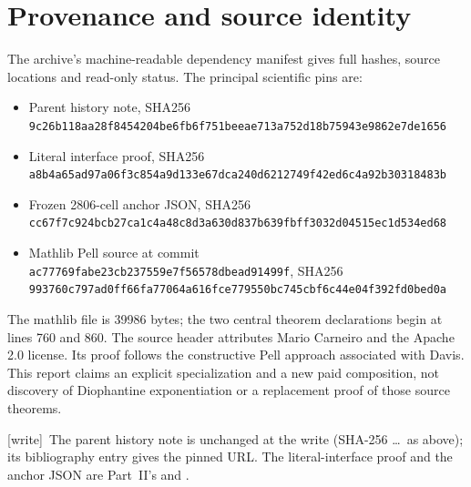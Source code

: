 \documentclass[11pt,letterpaper]{article}
\theoremstyle{definition}\newtheorem{definition}[theorem]{Definition}
\theoremstyle{remark}\newtheorem{remark}[theorem]{Remark}
\newcommand{\codeu}[1]{\nolinkurl{#1}}
\newcommand{\wtag}{\textup{[write]}}
\begin{document}
\section{Provenance and source identity}\label{ptr:ai:app:provenance}
The archive's machine-readable dependency manifest gives full hashes, source locations and read-only status. The principal scientific pins are:
\begin{itemize}
\item Parent history note, SHA256 \codeu{9c26b118aa28f8454204be6fb6f751beeae713a752d18b75943e9862e7de1656}
\item Literal interface proof, SHA256 \codeu{a8b4a65ad97a06f3c854a9d133e67dca240d6212749f42ed6c4a92b30318483b}
\item Frozen 2806-cell anchor JSON, SHA256 \codeu{cc67f7c924bcb27ca1c4a48c8d3a630d837b639fbff3032d04515ec1d534ed68}
\item Mathlib Pell source at commit \codeu{ac77769fabe23cb237559e7f56578dbead91499f}, SHA256 \codeu{993760c797ad0ff66fa77064a616fce779550bc745cbf6c44e04f392fd0bed0a}
\end{itemize}
The mathlib file is 39986 bytes; the two central theorem declarations begin at lines 760 and 860. The source header attributes Mario Carneiro and the Apache 2.0 license. Its proof follows the constructive Pell approach associated with Davis. This report claims an explicit specialization and a new paid composition, not discovery of Diophantine exponentiation or a replacement proof of those source theorems.

{\small\wtag\ The parent history note is unchanged at the write (SHA-256
\dots\ as above); its bibliography entry gives the pinned URL.
The literal-interface proof and the anchor JSON are Part~II's
 and
.\par}
\end{document}
